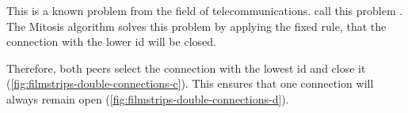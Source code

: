 This is a known problem from the field of telecommunications. \citet[pp. 194-194]{signaling-systems-book} call this problem .
The Mitosis algorithm solves this problem by applying the fixed rule, that the connection with the lower id will be closed.

Therefore, both peers select the connection with the lowest id and close it (\vref{fig:filmstrips-double-connections-c}). This ensures that one connection will always remain open (\vref{fig:filmstrips-double-connections-d}).